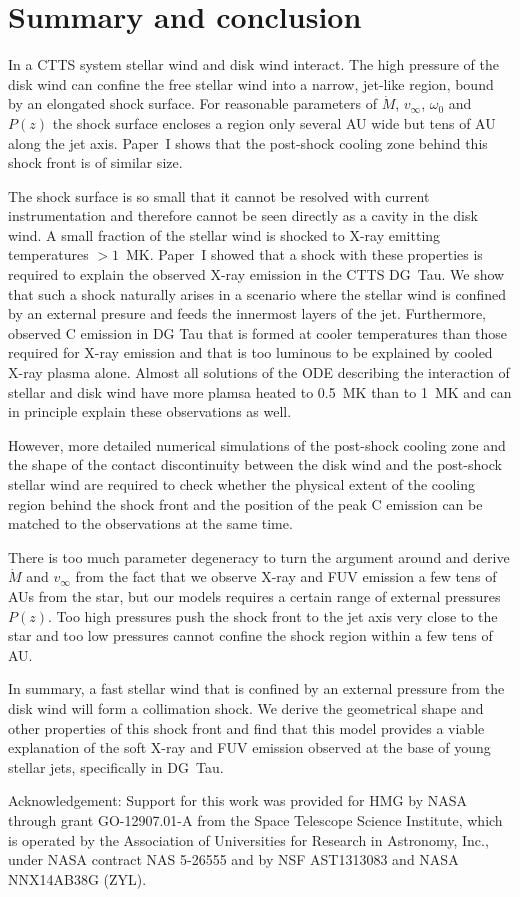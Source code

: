 \section{Summary and conclusion}
\label{sect:conclusion}
In a CTTS system stellar wind and disk wind interact. The high pressure of the disk wind can confine the free stellar wind into a narrow, jet-like region, bound by an elongated shock surface. For reasonable parameters of $\dot M$, $v_\infty$, $\omega_0$ and $P(z)$ the shock surface encloses a region only several AU wide but tens of AU along the jet axis. 
Paper~I shows that the post-shock cooling zone behind this shock front is of similar size.
 
The shock surface is so small that it cannot be resolved with current instrumentation and therefore cannot be seen directly as a cavity in the disk wind. A small fraction of the stellar wind is shocked to X-ray emitting temperatures $>1$~MK. 
Paper~I showed that a shock with these properties is required to explain the observed X-ray emission in the CTTS DG~Tau. We show that such a shock naturally arises in a scenario where the stellar wind is confined by an external presure and feeds the innermost layers of the jet.
Furthermore, \citet{2013A&A...550L...1S} observed C emission in DG Tau that is formed at cooler temperatures than those required for X-ray emission and that is too luminous to be explained by cooled X-ray plasma alone. Almost all solutions of the ODE describing the interaction of stellar and disk wind have more plamsa heated to 0.5~MK than to 1~MK and can in principle explain these observations as well.

However, more detailed numerical simulations of the post-shock cooling zone and the shape of the contact discontinuity between the disk wind and the post-shock stellar wind are required to check whether the physical extent of the cooling region behind the shock front and the position of the peak  C emission can be matched to the observations at the same time.

There is too much parameter degeneracy to turn the argument around and derive $\dot M$ and  $v_\infty$ from the fact that we observe X-ray and FUV emission a few tens of AUs from the star, but our models requires a certain range of external pressures $P(z)$. Too high pressures push the shock front to the jet axis very close to the star and too low pressures cannot confine the shock region within a few tens of AU.

In summary, a fast stellar wind that is confined by an external pressure from the disk wind will form a collimation shock. We derive the geometrical shape and other properties of this shock front and find that this model provides a viable explanation of the soft X-ray and FUV emission observed at the base of young stellar jets, specifically in DG~Tau.

Acknowledgement: Support for this work was provided for HMG by NASA through grant GO-12907.01-A from the Space Telescope Science Institute, which is operated by the Association of Universities for Research in Astronomy, Inc., under NASA contract NAS 5-26555 and by NSF AST1313083 and NASA NNX14AB38G (ZYL).